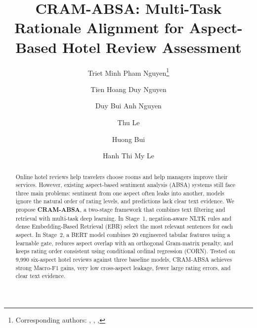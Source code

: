 \documentclass{llncs}
\begin{document}
\title{CRAM-ABSA: Multi-Task Rationale Alignment for Aspect-Based Hotel Review Assessment}

\author{Triet Minh Pham Nguyen\fnmsep\thanks{Corresponding authors: , , , } \and
Tien Hoang Duy Nguyen \and
Duy Bui Anh Nguyen \and
Thu Le \and
Huong Bui \and
Hanh Thi My Le}


\maketitle

\begin{abstract}
Online hotel reviews help travelers choose rooms and help managers improve their services. However, existing aspect-based sentiment analysis (ABSA) systems still face three main problems: sentiment from one aspect often leaks into another, models ignore the natural order of rating levels, and predictions lack clear text evidence. We propose \textbf{CRAM-ABSA}, a two-stage framework that combines text filtering and retrieval with multi-task deep learning. In Stage~1, negation-aware NLTK rules and dense Embedding-Based Retrieval (EBR) select the most relevant sentences for each aspect. In Stage~2, a BERT model combines 20 engineered tabular features using a learnable gate, reduces aspect overlap with an orthogonal Gram-matrix penalty, and keeps rating order consistent using conditional ordinal regression (CORN). Tested on 9,990 six-aspect hotel reviews against three baseline models, CRAM-ABSA achieves strong Macro-F1 gains, very low cross-aspect leakage, fewer large rating errors, and clear text evidence.
\end{abstract}

\nocite{ref01_bimaputra2023,ref02_bruni2025,ref03_nakamura2021,ref04_namee2023,ref05_nawawi2024,ref06_yu2024,ref07_apriliani2020,ref08_ounacer2023,ref09_nadeem2025,ref10_nguyen2023,ref11_sutherland2020,ref12_nam2021,ref13_zhang2022,ref14_jeong2024,ref15_pang2025,ref16_shin2024,ref17_perdomo2026,ref18_brauwers2022,ref19_tahir2024,ref20_vo2022,ref21_llorens2023,ref22_aransyah2026,ref23_lewis2020,ref24_reimers2019,ref25_le2026,ref26_piriyakul2024,ref27_alghuribi2025,ref28_xia2026,ref29_jayanto2022,ref30_tran2026}
\end{document}
